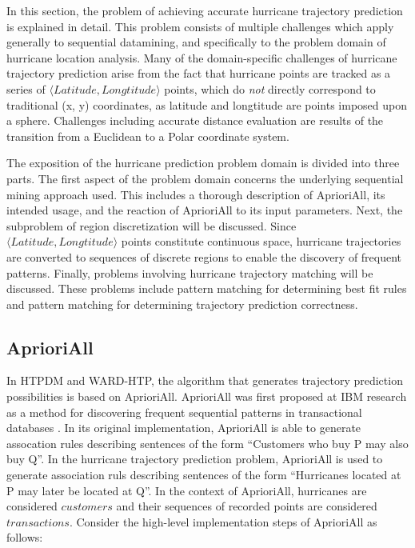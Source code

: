 \documentclass[12pt,conference]{IEEEtran}
\begin{document}

In this section, the problem of achieving accurate hurricane trajectory prediction is explained in detail. This problem consists of multiple challenges which apply generally to sequential datamining, and specifically to the problem domain of hurricane location analysis. Many of the domain-specific challenges of hurricane trajectory prediction arise from the fact that hurricane points are tracked as a series of $\langle Latitude, Longtitude \rangle$ points, which do \textit{not} directly correspond to traditional (x, y) coordinates, as latitude and longtitude are points imposed upon a sphere. Challenges including accurate distance evaluation are results of the transition from a Euclidean to a Polar coordinate system.

The exposition of the hurricane prediction problem domain is divided into three parts. The first aspect of the problem domain concerns the underlying sequential mining approach used. This includes a thorough description of AprioriAll, its intended usage, and the reaction of AprioriAll to its input parameters. Next, the subproblem of region discretization will be discussed. Since $\langle Latitude, Longtitude \rangle$ points constitute continuous space, hurricane trajectories are converted to sequences of discrete regions to enable the discovery of frequent patterns. Finally, problems involving hurricane trajectory matching will be discussed. These problems include pattern matching for determining best fit rules and pattern matching for determining trajectory prediction correctness.

\subsection{AprioriAll}

In HTPDM and WARD-HTP, the algorithm that generates trajectory prediction possibilities is based on AprioriAll. AprioriAll was first proposed at IBM research as a method for discovering frequent sequential patterns in transactional databases \cite{AprioriAll-original}. In its original implementation, AprioriAll is able to generate assocation rules describing sentences of the form ``Customers who buy P may also buy Q''. In the hurricane trajectory prediction problem, AprioriAll is used to generate association ruls describing sentences of the form ``Hurricanes located at P may later be located at Q''. In the context of AprioriAll, hurricanes are considered $customers$ and their sequences of recorded points are considered $transactions$. Consider the high-level implementation steps of AprioriAll as follows:
\end{document}

